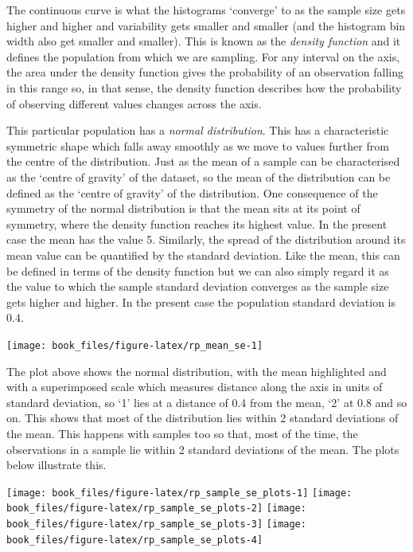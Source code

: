 \documentclass[
]{book}
\begin{document}
The continuous curve is what the histograms `converge' to as the sample size gets higher and higher and variability gets smaller and smaller (and the histogram bin width also get smaller and smaller). This is known as the \emph{density function} and it defines the population from which we are sampling. For any interval on the axis, the area under the density function gives the probability of an observation falling in this range so, in that sense, the density function describes how the probability of observing different values changes across the axis.

This particular population has a \emph{normal distribution}. This has a characteristic symmetric shape which falls away smoothly as we move to values further from the centre of the distribution. Just as the mean of a sample can be characterised as the `centre of gravity' of the dataset, so the mean of the distribution can be defined as the `centre of gravity' of the distribution. One consequence of the symmetry of the normal distribution is that the mean sits at its point of symmetry, where the density function reaches its highest value. In the present case the mean has the value 5. Similarly, the spread of the distribution around its mean value can be quantified by the standard deviation. Like the mean, this can be defined in terms of the density function but we can also simply regard it as the value to which the sample standard deviation converges as the sample size gets higher and higher. In the present case the population standard deviation is 0.4.

\begin{center}\texttt{[image: book\_files/figure-latex/rp\_mean\_se-1]} \end{center}

The plot above shows the normal distribution, with the mean highlighted and with a superimposed scale which measures distance along the axis in units of standard deviation, so `1' lies at a distance of 0.4 from the mean, `2' at 0.8 and so on. This shows that most of the distribution lies within 2 standard deviations of the mean. This happens with samples too so that, most of the time, the observations in a sample lie within 2 standard deviations of the mean. The plots below illustrate this.

\texttt{[image: book\_files/figure-latex/rp\_sample\_se\_plots-1]} \texttt{[image: book\_files/figure-latex/rp\_sample\_se\_plots-2]} \texttt{[image: book\_files/figure-latex/rp\_sample\_se\_plots-3]} \texttt{[image: book\_files/figure-latex/rp\_sample\_se\_plots-4]}
\end{document}
